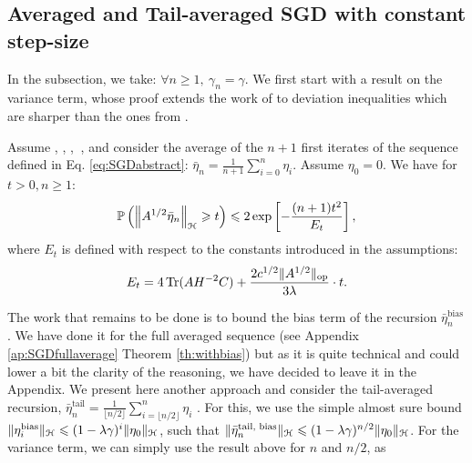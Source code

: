 \EIT

\subsection{Averaged and Tail-averaged SGD with constant step-size}
 
In the subsection, we take: $\forall n \geqslant 1, \ \gamma_n = \gamma$. We first start with a result on the variance term, whose proof extends the work of \citet{daft} to deviation inequalities which are sharper than the ones from \cite{newsto}.


\begin{theorem}
\label{th:SGDaveraged}
Assume , , ,$\ $ ,  and consider the average of the $n+1$ first iterates of the sequence defined in Eq. \eqref{eq:SGDabstract}: $\bar{\eta}_n = \frac{1}{n+1} \sum_{i=0}^n \eta_i$. Assume $\eta_0 = 0$.
 We have for $t > 0, n \geqslant 1$:    
\begin{equation}
\displaystyle{\mathbb P} \left( \left\| A^{1/2} \bar{\eta}_n  \right\|_{\mathcal H} \geqslant t \right) \leqslant 2 \exp\left[-\frac{(n+1) t^2}{E_t}\right],
\end{equation}
where $E_t$ is defined with respect to the constants introduced in the assumptions:  
\begin{equation}
\label{eq:Et}
 E_t =   4\operatorname{Tr}(AH^{-2}C)+\frac{2c^{1/2} \|A^{1/2}\|_{\textrm {op}}}{3\lambda}\cdot t  .
 \end{equation}
\end{theorem}
%
The work that remains to be done is to bound the bias term of the recursion $\bar{\eta}_n^{\textrm {bias}}$. We have done it for the full averaged sequence (see Appendix \ref{ap:SGDfullaverage} Theorem \ref{th:withbias}) but as it is quite technical and could lower a bit the clarity of the reasoning, we have decided to leave it in the Appendix. We present here another approach and consider the tail-averaged recursion, $\bar{\eta}_n^{\textrm {tail}} 
= \frac{1}{\lfloor n/2 \rfloor} \sum_{i=\lfloor n/2 \rfloor}^{n} \eta_i$ \citep[as proposed by][]{jain2016parallelizing,shamir2011SGD}.
%
For this, we use the simple almost sure bound
$ \| \eta_i^{\textrm {bias}} \|_{\mathcal H} \leqslant ( 1- \lambda \gamma )^i \|\eta_0\|_{\mathcal H}$, such that 
$\| \bar{\eta}_n^{\textrm {tail, bias}} \|_{\mathcal H} \leqslant ( 1- \lambda \gamma )^{n/2} \|\eta_0\|_{\mathcal H}$. For the variance term, we can simply use the result above for $n$ and $n/2$, as 
